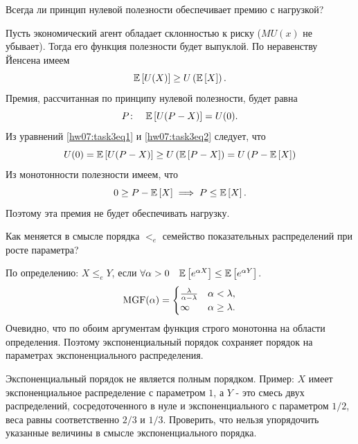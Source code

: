 \problem{} Всегда ли принцип нулевой полезности обеспечивает премию с нагрузкой?

\solution{}
    Пусть экономический агент обладает склонностью к риску ($MU(x)$ не убывает). Тогда его функция полезности будет выпуклой. По неравенству Йенсена имеем
    \begin{equation}\label{hw07:task3eq1}
        \mathbb{E}\left[U(X)\right] \geq U\left(\mathbb{E}\left[X\right]\right).
    \end{equation}
    Премия, рассчитанная по принципу нулевой полезности, будет равна
    \begin{equation}\label{hw07:task3eq2}
        P\colon \quad \mathbb{E}\left[U(P-X)\right] = U(0).
    \end{equation}
    Из уравнений \eqref{hw07:task3eq1} и \eqref{hw07:task3eq2} следует, что
    \begin{equation}
        U(0) = \mathbb{E}\left[U(P-X)\right] \geq U\left(\mathbb{E}\left[P-X\right]\right) = U\left(P-\mathbb{E}\left[X\right]\right)
    \end{equation}
    Из монотонности полезности имеем, что 
    \begin{equation}
        0\geq P-\mathbb{E}\left[X\right] \implies P\leq\mathbb{E}\left[X\right]. 
    \end{equation}
    Поэтому эта премия не будет обеспечивать нагрузку.

\problem{} 
Как меняется в смысле порядка $<_e$ семейство показательных распределений при росте параметра?

\solution{}
    По определению: $X\leq_eY$, если $\forall \alpha > 0 \quad \mathbb{E}\left[e^{\alpha X}\right] \leq \mathbb{E}\left[e^{\alpha Y}\right]$.
    \begin{equation}
        \operatorname{MGF}(\alpha) = \begin{cases}
            \frac{\lambda}{\alpha-\lambda} & \alpha < \lambda, \\
            \infty & \alpha \geq \lambda.
        \end{cases}
    \end{equation}
    Очевидно, что по обоим аргументам функция строго монотонна на области определения. Поэтому экспоненциальный порядок сохраняет порядок на параметрах экспоненциального распределения.

\problem{} Экспоненциальный порядок не является полным порядком. Пример: $X$ имеет экспоненциальное распределение с
параметром $1$, а $Y$ - это смесь двух распределений, сосредоточенного в нуле и экспоненциального с параметром $1/2$, веса равны
соответственно $2/3$ и $1/3$. Проверить, что нельзя упорядочить указанные величины в смысле экспоненциального порядка.

